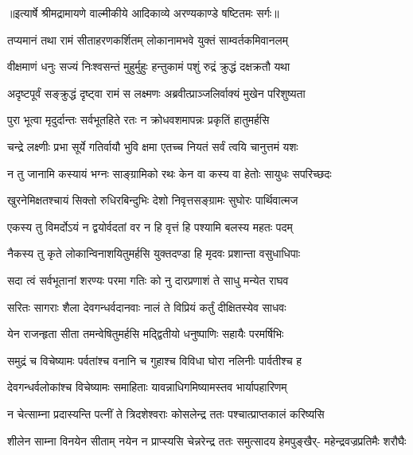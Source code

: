 {॥इत्यार्षे श्रीमद्रामायणे वाल्मीकीये आदिकाव्ये अरण्यकाण्डे षष्टितमः सर्गः॥}


\twolineshloka
{तप्यमानं तथा रामं सीताहरणकर्शितम्}
{लोकानामभवे युक्तं साम्वर्तकमिवानलम्} %

\twolineshloka
{वीक्षमाणं धनुः सज्यं निःश्वसन्तं मुहुर्मुहुः}
{हन्तुकामं पशुं रुद्रं क्रुद्धं दक्षक्रतौ यथा} %

\twolineshloka
{अदृष्टपूर्वं सङ्क्रुद्धं दृष्ट्वा रामं स लक्ष्मणः}
{अब्रवीत्प्राञ्जलिर्वाक्यं मुखेन परिशुष्यता} %

\twolineshloka
{पुरा भूत्वा मृदुर्दान्तः सर्वभूतहिते रतः}
{न क्रोधवशमापन्नः प्रकृतिं हातुमर्हसि} %

\twolineshloka
{चन्द्रे लक्ष्णीः प्रभा सूर्ये गतिर्वायौ भुवि क्षमा}
{एतच्च नियतं सर्वं त्वयि चानुत्तमं यशः} %

\twolineshloka
{न तु जानामि कस्यायं भग्नः साङ्ग्रामिको रथः}
{केन वा कस्य वा हेतोः सायुधः सपरिच्छदः} %

\twolineshloka
{खुरनेमिक्षतश्चायं सिक्तो रुधिरबिन्दुभिः}
{देशो निवृत्तसङ्ग्रामः सुघोरः पार्थिवात्मज} %

\twolineshloka
{एकस्य तु विमर्दोऽयं न द्वयोर्वदतां वर}
{न हि वृत्तं हि पश्यामि बलस्य महतः पदम्} %

\twolineshloka
{नैकस्य तु कृते लोकान्विनाशयितुमर्हसि}
{युक्तदण्डा हि मृदवः प्रशान्ता वसुधाधिपाः} %

\twolineshloka
{सदा त्वं सर्वभूतानां शरण्यः परमा गतिः}
{को नु दारप्रणाशं ते साधु मन्येत राघव} %

\twolineshloka
{सरितः सागराः शैला देवगन्धर्वदानवाः}
{नालं ते विप्रियं कर्तुं दीक्षितस्येव साधवः} %

\twolineshloka
{येन राजन्हृता सीता तमन्वेषितुमर्हसि}
{मद्द्वितीयो धनुष्पाणिः सहायैः परमर्षिभिः} %

\twolineshloka
{समुद्रं च विचेष्यामः पर्वतांश्च वनानि च}
{गुहाश्च विविधा घोरा नलिनीः पार्वतीश्च ह} %

\twolineshloka
{देवगन्धर्वलोकांश्च विचेष्यामः समाहिताः}
{यावन्नाधिगमिष्यामस्तव भार्यापहारिणम्} %

\twolineshloka
{न चेत्साम्ना प्रदास्यन्ति पत्नीं ते त्रिदशेश्वराः}
{कोसलेन्द्र ततः पश्चात्प्राप्तकालं करिष्यसि} %

\fourlineindentedshloka
{शीलेन साम्ना विनयेन सीताम्}
{नयेन न प्राप्स्यसि चेन्नरेन्द्र}
{ततः समुत्सादय हेमपुङ्खैर्-}
{महेन्द्रवज्रप्रतिमैः शरौघैः} %


